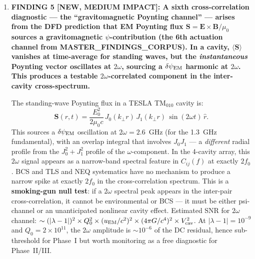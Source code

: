 \documentclass[11pt]{article}
\newcommand{\dpsi}{\delta\psi}
\newcommand{\lbone}{|\lambda - 1|}
\newcommand{\ee}[1]{\times 10^{#1}}
\theoremstyle{definition}
\theoremstyle{remark}
\begin{document}
\begin{tcolorbox}[colback=blue!5!white, colframe=blue!60!black,
  title=\textbf{W4i13 TOP 5 FINDINGS --- Ranked by Programme Impact}]
\begin{enumerate}
The W4i10 blind analysis (Section~6.2) adds a random secret offset
to each cavity's $Q_0(t)$ before cross-correlation. However, the
Q-ratio $\mathcal{R} = \delta Q_0^{-1}(2.4)/\delta Q_0^{-1}(1.3)$
is a \emph{ratio} of excess losses, not an absolute value, so
a uniform additive offset to $Q_0$ does \emph{not} blind $\mathcal{R}$.
This means analysts can compute $\mathcal{R}$ before unblinding,
introducing a potential look-elsewhere bias on the primary diagnostic.
The fix: apply \emph{independent, frequency-specific} multiplicative
scrambling factors $s_f \in [0.8, 1.2]$ to the residual loss at
each frequency, drawn from a sealed random number generator. The
three-component blind:
(a)~$Q_0$ offset blinds absolute cross-correlation amplitude,
(b)~random sign flip on $\tilde{C}_{ij}$ blinds correlation direction,
(c)~frequency-specific scaling blinds $\mathcal{R}$.
All three are removed simultaneously at the pre-registered unblinding event.

\item \textbf{FINDING 5 [NEW, MEDIUM IMPACT]: A sixth cross-correlation
diagnostic --- the ``gravitomagnetic Poynting channel'' --- arises from
the DFD prediction that EM Poynting flux $\mathbf{S} = \mathbf{E}\times
\mathbf{B}/\mu_0$ sources a gravitomagnetic $\psi$-contribution
(the 6th actuation channel from MASTER\_FINDINGS\_CORPUS). In a cavity,
$\langle\mathbf{S}\rangle$ vanishes at time-average for standing waves,
but the \emph{instantaneous} Poynting vector oscillates at $2\omega$,
sourcing a $\dpsi_{\rm EM}$ harmonic at $2\omega$. This produces a
testable $2\omega$-correlated component in the inter-cavity cross-spectrum.}

The standing-wave Poynting flux in a TESLA TM$_{010}$ cavity is:
\begin{equation}
\mathbf{S}(r,t) = \frac{E_0^2}{2\mu_0 c}\,J_0(k_\perp r)\,J_1(k_\perp r)
\,\sin(2\omega t)\,\hat{r}.
\end{equation}
This sources a $\dpsi_{\rm EM}$ oscillation at $2\omega = 2.6$~GHz
(for the 1.3~GHz fundamental), with an overlap integral that involves
$J_0 J_1$ --- a \emph{different} radial profile from the $J_0^2 + J_1^2$
profile of the $\omega$-component. In the 4-cavity array, this $2\omega$
signal appears as a narrow-band spectral feature in $C_{ij}(f)$ at
exactly $2f_0$. BCS and TLS and NEQ systematics have no mechanism to
produce a narrow spike at exactly $2f_0$ in the cross-correlation spectrum.
This is a \textbf{smoking-gun null test}: if a $2\omega$ spectral peak
appears in the inter-pair cross-correlation, it cannot be environmental
or BCS --- it must be either psi-channel or an unanticipated nonlinear
cavity effect. Estimated SNR for $2\omega$ channel:
$\sim (\lbone)^2 \times Q_0^2 \times (u_{\rm EM}/c^2)^2
\times (4\pi G/c^4)^2 \times V_{\rm cav}^2$.
At $\lbone = 10^{-9}$ and $Q_0 = 2\ee{11}$, the $2\omega$ amplitude
is $\sim 10^{-6}$ of the DC residual, hence sub-threshold for Phase~I
but worth monitoring as a free diagnostic for Phase~II/III.

\end{enumerate}
\end{tcolorbox}
\end{document}
